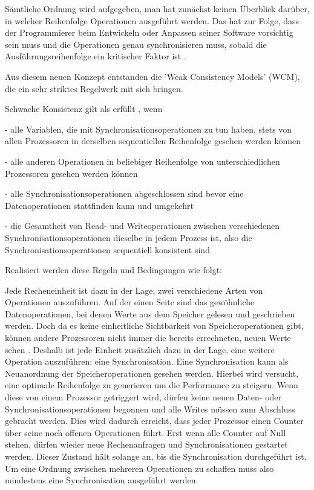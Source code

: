 \documentclass[final,bibliography=totocnumbered]{include/sikseminar}
\begin{document}
Sämtliche Ordnung wird aufgegeben, man hat zunächst keinen Überblick darüber, in welcher Reihenfolge Operationen ausgeführt werden.
Das hat zur Folge, dass der Programmierer beim Entwickeln oder Anpassen seiner Software vorsichtig sein muss und die Operationen genau synchronisieren muss, sobald die Ausführungsreihenfolge 
ein kritischer Faktor ist \cite{designingmcm}.

Aus diesem neuen Konzept entstanden die 'Weak Consistency Models' (WCM), die ein sehr striktes Regelwerk mit sich bringen.
 


Schwache Konsistenz gilt als erfüllt \cite{mcm5}\cite{mcm}\cite{unified}, wenn

- alle Variablen, die mit Synchronisationsoperationen zu tun haben, stets von allen Prozessoren in derselben sequentiellen Reihenfolge gesehen werden können 

- alle anderen Operationen in beliebiger Reihenfolge von unterschiedlichen Prozessoren gesehen werden können

- alle Synchronisationsoperationen abgeschlossen sind bevor eine Datenoperationen stattfinden kann und umgekehrt

- die Gesamtheit von Read- und Writeoperationen zwischen verschiedenen Synchronisationsoperationen dieselbe in jedem Prozess ist, also die Synchronisationsoperationen sequentiell konsistent sind



Realisiert werden diese Regeln und Bedingungen wie folgt:

Jede Recheneinheit ist dazu in der Lage, zwei verschiedene Arten von Operationen auszuführen. Auf der einen Seite sind das 
gewöhnliche Datenoperationen, bei denen Werte aus dem Speicher gelesen und geschrieben werden. 
Doch da es keine einheitliche Sichtbarkeit von Speicheroperationen gibt, können andere Prozessoren nicht immer die bereits errechneten, neuen Werte sehen \cite{mcm5}. 
Deshalb ist jede Einheit zusätzlich dazu in der Lage, eine weitere Operation auszuführen: eine Synchronisation. Eine Synchronisation kann als Neuanordnung der Speicheroperationen gesehen werden. Hierbei wird versucht, eine optimale Reihenfolge zu generieren um die Performance zu steigern.
Wenn diese von einem Prozessor getriggert wird, dürfen keine neuen Daten- oder Synchronisationsoperationen begonnen und alle Writes müssen zum Abschluss gebracht werden.
Dies wird dadurch erreicht, dass jeder Prozessor einen Counter über seine noch offenen Operationen führt. Erst wenn alle Counter auf Null stehen, dürfen wieder neue Rechenanfragen und Synchronisationen gestartet werden.
Dieser Zustand hält solange an, bis die Synchronisation durchgeführt ist. Um eine Ordnung zwischen mehreren Operationen zu schaffen muss also mindestens eine Synchronisation ausgeführt werden.
\end{document}
